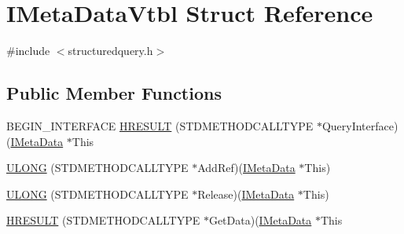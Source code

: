 \hypertarget{struct_i_meta_data_vtbl}{}\section{I\+Meta\+Data\+Vtbl Struct Reference}
\label{struct_i_meta_data_vtbl}


{\ttfamily \#include $<$structuredquery.\+h$>$}

\subsection*{Public Member Functions}
\begin{DoxyCompactItemize}
\item 
B\+E\+G\+I\+N\+\_\+\+I\+N\+T\+E\+R\+F\+A\+CE \hyperlink{struct_i_meta_data_vtbl_ad05c02f539db5cdaebecd8c683829029}{H\+R\+E\+S\+U\+LT} (S\+T\+D\+M\+E\+T\+H\+O\+D\+C\+A\+L\+L\+T\+Y\+PE $\ast$Query\+Interface)(\hyperlink{structuredquery_8h_a586ffbe8894bb76ced4a747f82f0e13c}{I\+Meta\+Data} $\ast$This
\item 
\hyperlink{struct_i_meta_data_vtbl_ae0c0634f3a1d1e2a5a80ac78d6573c2d}{U\+L\+O\+NG} (S\+T\+D\+M\+E\+T\+H\+O\+D\+C\+A\+L\+L\+T\+Y\+PE $\ast$Add\+Ref)(\hyperlink{structuredquery_8h_a586ffbe8894bb76ced4a747f82f0e13c}{I\+Meta\+Data} $\ast$This)
\item 
\hyperlink{struct_i_meta_data_vtbl_a8b72e152266fc7640e81507f6342ba7f}{U\+L\+O\+NG} (S\+T\+D\+M\+E\+T\+H\+O\+D\+C\+A\+L\+L\+T\+Y\+PE $\ast$Release)(\hyperlink{structuredquery_8h_a586ffbe8894bb76ced4a747f82f0e13c}{I\+Meta\+Data} $\ast$This)
\item 
\hyperlink{struct_i_meta_data_vtbl_a6fd22836419b5718536a3e741971f1ac}{H\+R\+E\+S\+U\+LT} (S\+T\+D\+M\+E\+T\+H\+O\+D\+C\+A\+L\+L\+T\+Y\+PE $\ast$Get\+Data)(\hyperlink{structuredquery_8h_a586ffbe8894bb76ced4a747f82f0e13c}{I\+Meta\+Data} $\ast$This
\end{DoxyCompactItemize}

